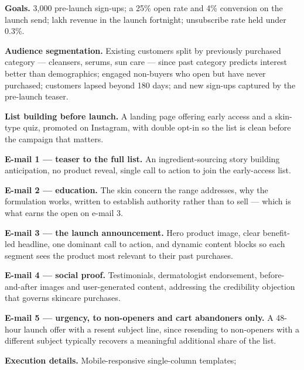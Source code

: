 \begin{qlist}
\begin{apts}
\item \textbf{Goals.} 3{,}000 pre-launch sign-ups; a 25\% open rate and 4\%
      conversion on the launch send;  lakh revenue in the launch
      fortnight; unsubscribe rate held under 0.3\%.
\item \textbf{Audience segmentation.} Existing customers split by previously
      purchased category --- cleansers, serums, sun care --- since past category
      predicts interest better than demographics; engaged non-buyers who open
      but have never purchased; customers lapsed beyond 180 days; and new
      sign-ups captured by the pre-launch teaser.
\item \textbf{List building before launch.} A landing page offering early access
      and a skin-type quiz, promoted on Instagram, with double opt-in so the
      list is clean before the campaign that matters.
\item \textbf{E-mail 1 --- teaser to the full list.} An ingredient-sourcing
      story building anticipation, no product reveal, single call to action to
      join the early-access list.
\item \textbf{E-mail 2 --- education.} The skin concern the range addresses, why
      the formulation works, written to establish authority rather than to sell
      --- which is what earns the open on e-mail 3.
\item \textbf{E-mail 3 --- the launch announcement.} Hero product image, clear
      benefit-led headline, one dominant call to action, and dynamic content
      blocks so each segment sees the product most relevant to their past
      purchases.
\item \textbf{E-mail 4 --- social proof.} Testimonials, dermatologist
      endorsement, before-and-after images and user-generated content,
      addressing the credibility objection that governs skincare purchases.
\item \textbf{E-mail 5 --- urgency, to non-openers and cart abandoners only.} A
      48-hour launch offer with a resent subject line, since resending to
      non-openers with a different subject typically recovers a meaningful
      additional share of the list.
\item \textbf{Execution details.} Mobile-responsive single-column templates;

\end{apts}
\end{qlist}

